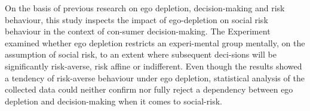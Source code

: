 On the basis of previous research on ego depletion, decision-making and risk behaviour, this study inspects the impact of ego-depletion on social risk behaviour in the context of con-sumer decision-making. The Experiment examined whether ego depletion restricts an experi-mental group mentally, on the assumption of social risk, to an extent where subsequent deci-sions will be significantly risk-averse, risk affine or indifferent. Even though the results showed a tendency of risk-averse behaviour under ego depletion, statistical analysis of the collected data could neither confirm nor fully reject a dependency between ego depletion and decision-making when it comes to social-risk.